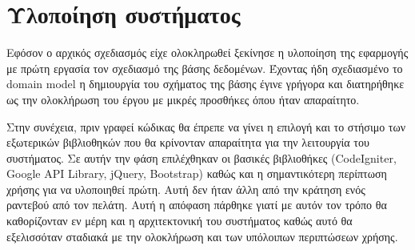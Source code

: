 \section{Υλοποίηση συστήματος}
Εφόσον ο αρχικός σχεδιασμός είχε ολοκληρωθεί ξεκίνησε η υλοποίηση της εφαρμογής με πρώτη εργασία τον σχεδιασμό της βάσης δεδομένων. Έχοντας ήδη σχεδιασμένο το domain model η δημιουργία του σχήματος της βάσης έγινε γρήγορα και διατηρήθηκε ως την ολοκλήρωση του έργου με μικρές προσθήκες όπου ήταν απαραίτητο. 

Στην συνέχεια, πριν γραφεί κώδικας θα έπρεπε να γίνει η επιλογή και το στήσιμο των εξωτερικών βιβλιοθηκών που θα κρίνονταν απαραίτητα για την λειτουργία του συστήματος. Σε αυτήν την φάση επιλέχθηκαν οι βασικές βιβλιοθήκες (CodeIgniter, Google API Library, jQuery, Bootstrap) καθώς και η σημαντικότερη περίπτωση χρήσης για να υλοποιηθεί πρώτη. Αυτή δεν ήταν άλλη από την κράτηση ενός ραντεβού από τον πελάτη. Αυτή η απόφαση πάρθηκε γιατί με αυτόν τον τρόπο θα καθορίζονταν εν μέρη και η αρχιτεκτονική του συστήματος καθώς αυτό θα εξελισσόταν σταδιακά με την ολοκλήρωση και των υπόλοιπων περιπτώσεων χρήσης.

